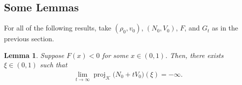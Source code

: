 \documentclass[11pt]{article}
\newtheorem{lemma}[thm]{Lemma}
\numberwithin{equation}{section}
\DeclareMathOperator{\proj}{proj}
\begin{document}
\subsection{Some Lemmas}
For all of the following results, take $(\rho_0,v_0)$, $(N_0,V_0)$, $F$, and $G_t$ as in the previous section. 
\begin{lemma}\label{divergence-of-projection}
    Suppose $F(x)<0$ for some $x\in(0,1)$. Then, there exists $\xi\in(0,1)$ such that 
    \begin{align*}
        \lim_{t\to\infty}\proj_{\mathcal{K}}\Big(N_0+tV_0\Big)(\xi)=-\infty.
    \end{align*}
\end{lemma}
\end{document}
